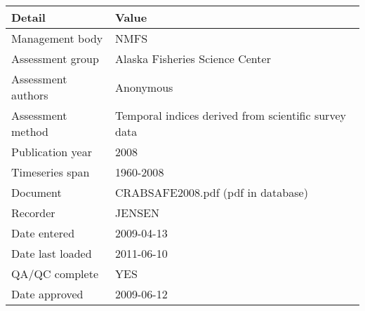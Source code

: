 \begin{table}[htb]
\centering
\begin{tabular}{lp{7cm}}
\toprule
Detail & Value \\
\midrule
Management body    & NMFS                                                 \\
Assessment group   & Alaska Fisheries Science Center                      \\
Assessment authors & Anonymous                                            \\
Assessment method  & Temporal indices derived from scientific survey data \\
Publication year   & 2008                                                 \\
Timeseries span    & 1960-2008                                            \\
Document           & CRABSAFE2008.pdf (pdf in database)                   \\
Recorder           & JENSEN                                               \\
Date entered       & 2009-04-13                                           \\
Date last loaded   & 2011-06-10                                           \\
QA/QC complete     & YES                                                  \\
Date approved      & 2009-06-12                                           \\
\bottomrule
\end{tabular}
\label{tab:assessdet}
\end{table}
